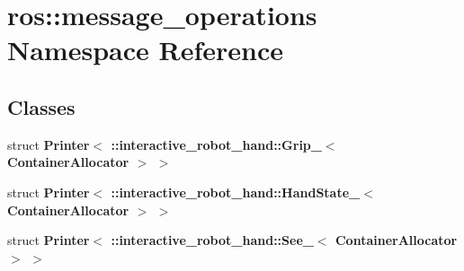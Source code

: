 \section{ros\-:\-:message\-\_\-operations Namespace Reference}
\label{namespaceros_1_1message__operations}
\subsection*{Classes}
\begin{DoxyCompactItemize}
\item 
struct {\bf Printer$<$ \-::interactive\-\_\-robot\-\_\-hand\-::\-Grip\-\_\-$<$ Container\-Allocator $>$ $>$}
\item 
struct {\bf Printer$<$ \-::interactive\-\_\-robot\-\_\-hand\-::\-Hand\-State\-\_\-$<$ Container\-Allocator $>$ $>$}
\item 
struct {\bf Printer$<$ \-::interactive\-\_\-robot\-\_\-hand\-::\-See\-\_\-$<$ Container\-Allocator $>$ $>$}
\end{DoxyCompactItemize}
